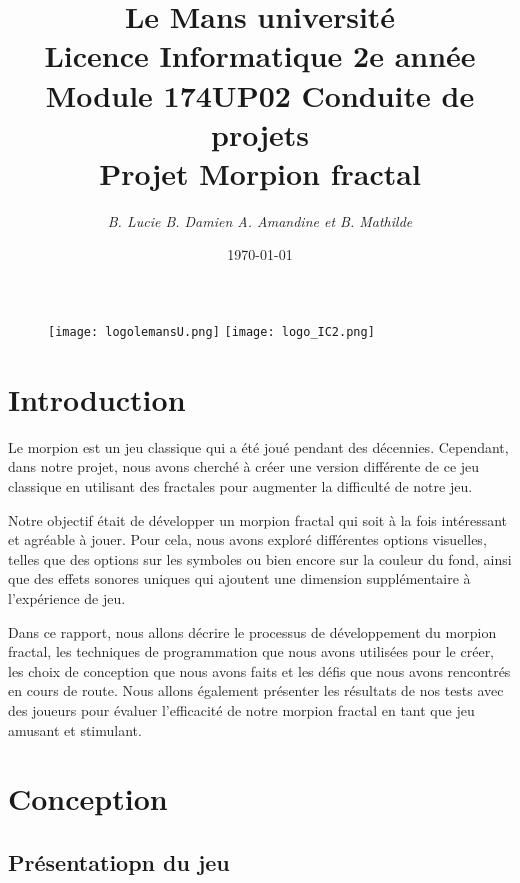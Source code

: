 \documentclass[12pt,a4paper]{article}
\begin{document}
\begin{figure}[t]
 \begin{center}
 \texttt{[image: logolemansU.png]}
\hfill
 \texttt{[image: logo\_IC2.png]}
 \end{center}
 \end{figure}
\title{\color{blue}Le Mans université \\\color{black} Licence Informatique 2e année\\ Module 174UP02 Conduite de projets\\\textbf {Projet Morpion fractal}}
\author{\textit{B. Lucie B. Damien A. Amandine et B. Mathilde}}
\date{\today}
\maketitle
\color{black}
\newpage
\tableofcontents
    \newpage
    \section{Introduction}
Le morpion est un jeu classique qui a été joué pendant des décennies. Cependant, dans notre projet, nous avons cherché à créer une version différente de ce jeu classique en utilisant des fractales pour augmenter la difficulté de notre jeu.

Notre objectif était de développer un morpion fractal qui soit à la fois intéressant et agréable à jouer.
Pour cela, nous avons exploré différentes options visuelles, telles que des options sur les symboles ou bien encore sur la couleur du fond, ainsi que des effets sonores uniques qui ajoutent une dimension supplémentaire à l'expérience de jeu.

Dans ce rapport, nous allons décrire le processus de développement du morpion fractal, les techniques de programmation que nous avons utilisées pour le créer, les choix de conception que nous avons faits et les défis que nous avons rencontrés en cours de route. Nous allons également présenter les résultats de nos tests avec des joueurs pour évaluer l'efficacité de notre morpion fractal en tant que jeu amusant et stimulant.
    
    \section{Conception}
    
\subsection{Présentatiopn du jeu}
\end{document}
